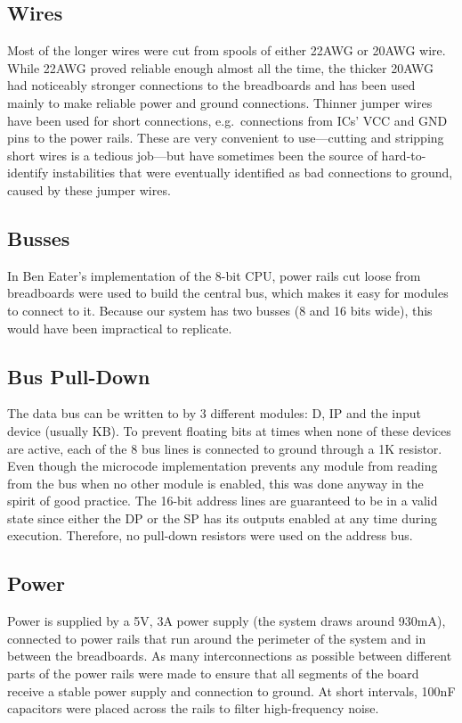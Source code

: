 \subsection{Wires} Most of the longer wires were cut from spools of either 22AWG or 20AWG wire. While 22AWG proved reliable enough almost all the time, the thicker 20AWG had noticeably stronger connections to the breadboards and has been used mainly to make reliable power and ground connections. Thinner jumper wires have been used for short connections, e.g.~connections from ICs' VCC and GND pins to the power rails. These are very convenient to use---cutting and stripping short wires is a tedious job---but have sometimes been the source of hard-to-identify instabilities that were eventually identified as bad connections to ground, caused by these jumper wires.

\subsection{Busses}
In Ben Eater's implementation of the 8-bit CPU, power rails cut loose from breadboards were used to build the central bus, which makes it easy for modules to connect to it. Because our system has two busses (8 and 16 bits wide), this would have been impractical to replicate.

\subsection{Bus Pull-Down}
The data bus can be written to by 3 different modules: D, IP and the input device (usually KB). To prevent floating bits at times when none of these devices are active, each of the 8 bus lines is connected to ground through a 1K resistor. Even though the microcode implementation prevents any module from reading from the bus when no other module is enabled, this was done anyway in the spirit of good practice. The 16-bit address lines are guaranteed to be in a valid state since either the DP or the SP has its outputs enabled at any time during execution. Therefore, no pull-down resistors were used on the address bus.

\subsection{Power}
Power is supplied by a 5V, 3A power supply (the system draws around 930mA), connected to power rails that run around the perimeter of the system and in between the breadboards. As many interconnections as possible between different parts of the power rails were made to ensure that all segments of the board receive a stable power supply and connection to ground. At short intervals, 100nF capacitors were placed across the rails to filter high-frequency noise.

